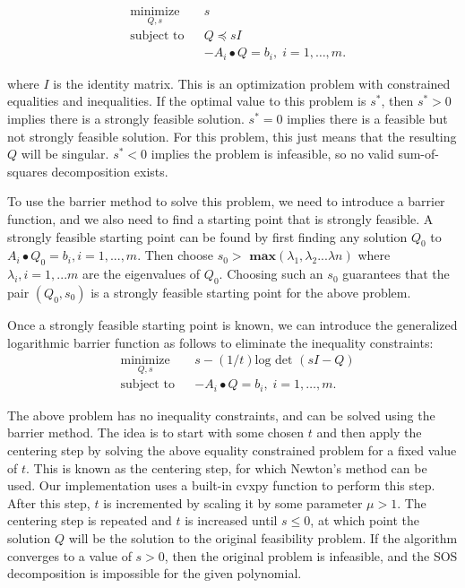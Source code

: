 \documentclass{article}
\begin{document}
\begin{equation*}
\begin{aligned}
& \underset{Q,s}{\text{minimize}}
& & s \\
& \text{subject to}
& & Q \preceq sI  \\
& 
& & - A_i \bullet Q = b_i, \; i = 1, \ldots, m. 
\end{aligned}
\end{equation*}

where $I$ is the identity matrix. This is an optimization problem with constrained equalities and inequalities. If the optimal value to this problem is $s^{*}$, then $s^{*} > 0 $ implies there is a strongly feasible solution.  $s^{*} = 0 $ implies there is a feasible but not strongly feasible solution. For this problem, this just means that the resulting $Q$ will be singular.  $s^{*} < 0 $ implies the problem is infeasible, so no valid sum-of-squares decomposition exists. 

To use the barrier method to solve this problem, we need to introduce a barrier function, and we also need to find a starting point that is strongly feasible. A strongly feasible starting point can be found by first finding any solution  $Q_{0}$ to $A_{i} \bullet Q_{0} = b_{i}, i = 1,...,m$. Then choose $s_{0} > \textbf{ max}(\lambda_{1}, \lambda_{2}...\lambda{n})$ where $\lambda_{i}, i = 1,...m$ are the eigenvalues of $Q_{0}$. Choosing such an $s_{0}$ guarantees that the pair $(Q_{0},s_{0})$ is a strongly feasible starting point for the above problem.

Once a strongly feasible starting point is known, we can introduce the generalized logarithmic barrier function as follows to eliminate the inequality constraints:
\begin{equation*}
\begin{aligned}
& \underset{Q,s}{\text{minimize}}
& & s - (1/t)\text{log }\text{det } (sI - Q)  \\
& \text{subject to}
& & - A_i \bullet Q = b_i, \; i = 1, \ldots, m. 
\end{aligned}
\end{equation*}

The above problem has no inequality constraints, and can be solved using the barrier method. The idea is to start with some chosen $t$ and then apply the centering step by solving the above equality constrained problem for a fixed value of $t$. This is known as the centering step, for which Newton's method can be used. Our implementation uses a built-in cvxpy function to perform this step. After this step, $t$ is incremented by scaling it by some parameter $\mu > 1$. The centering step is repeated and $t$ is increased until $s \leq 0$, at which point the solution $Q$ will be the solution to the original feasibility problem. If the algorithm converges to a value of $s > 0$, then the original problem is infeasible, and the SOS decomposition is impossible for the given polynomial. \\ \\
\end{document}
